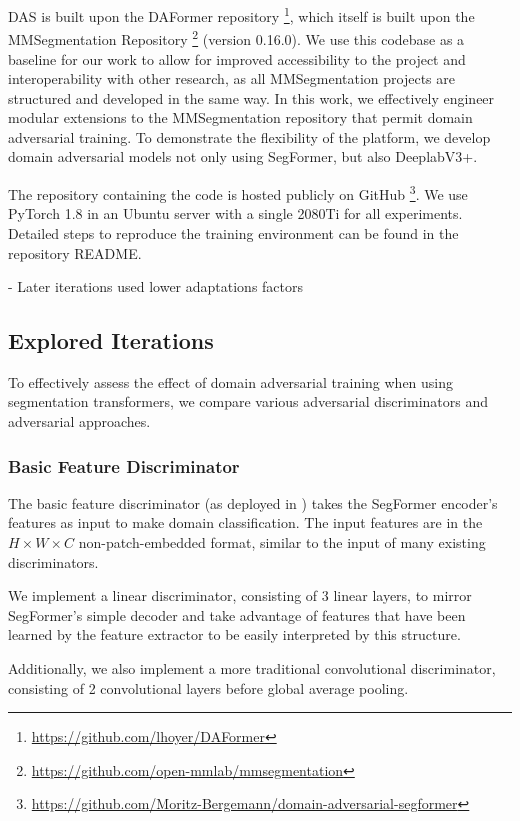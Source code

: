 \documentclass[a4paper,12pt]{report}
\begin{document}
DAS is built upon the DAFormer \cite{hoyer_daformer_2022} repository \footnote{\url{https://github.com/lhoyer/DAFormer}}, which itself is built upon the MMSegmentation Repository \footnote{\url{https://github.com/open-mmlab/mmsegmentation}} (version 0.16.0). We use this codebase as a baseline for our work to allow for improved accessibility to the project and interoperability with other research, as all MMSegmentation projects are structured and developed in the same way. In this work, we effectively engineer modular extensions to the MMSegmentation repository that permit domain adversarial training. To demonstrate the flexibility of the platform, we develop domain adversarial models not only using SegFormer, but also DeeplabV3+.

The repository containing the code is hosted publicly on GitHub \footnote{\url{https://github.com/Moritz-Bergemann/domain-adversarial-segformer}}. We use PyTorch 1.8 in an Ubuntu server with a single 2080Ti for all experiments. Detailed steps to reproduce the training environment can be found in the repository README.

- Later iterations used lower adaptations factors
\subsection{Explored Iterations}
To effectively assess the effect of domain adversarial training when using segmentation transformers, we compare various adversarial discriminators and adversarial approaches.

\subsubsection{Basic Feature Discriminator}
The basic feature discriminator (as deployed in \cite{hoffman_fcns_2016}) takes the SegFormer encoder's features as input to make domain classification. The input features are in the $H \times W \times C$ non-patch-embedded format, similar to the input of many existing discriminators.

We implement a linear discriminator, consisting of 3 linear layers, to mirror SegFormer's simple decoder and take advantage of features that have been learned by the feature extractor to be easily interpreted by this structure.

Additionally, we also implement a more traditional convolutional discriminator, consisting of 2 convolutional layers before global average pooling. %
\end{document}
